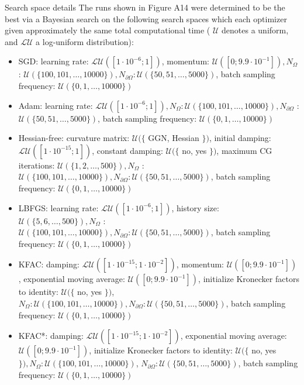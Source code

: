 \documentclass[10pt]{article}
\begin{document}
Search space details The runs shown in Figure A14 were determined to be the best via a Bayesian search on the following search spaces which each optimizer given approximately the same total computational time ( $\mathcal{U}$ denotes a uniform, and $\mathcal{L U}$ a log-uniform distribution):

\begin{itemize}
  \item SGD: learning rate: $\mathcal{L U}\left(\left[1 \cdot 10^{-6} ; 1\right]\right)$, momentum: $\mathcal{U}\left(\left[0 ; 9.9 \cdot 10^{-1}\right]\right), N_{\Omega}$ : $\mathcal{U}(\{100,101, \ldots, 10000\}), N_{\partial \Omega}: \mathcal{U}(\{50,51, \ldots, 5000\})$, batch sampling frequency: $\mathcal{U}(\{0,1, \ldots, 10000\})$
  \item Adam: learning rate: $\mathcal{L U}\left(\left[1 \cdot 10^{-6} ; 1\right]\right), N_{\Omega}: \mathcal{U}(\{100,101, \ldots, 10000\}), N_{\partial \Omega}$ : $\mathcal{U}(\{50,51, \ldots, 5000\})$, batch sampling frequency: $\mathcal{U}(\{0,1, \ldots, 10000\})$
  \item Hessian-free: curvature matrix: $\mathcal{U}(\{$ GGN, Hessian $\})$, initial damping: $\mathcal{L U}\left(\left[1 \cdot 10^{-15} ; 1\right]\right)$, constant damping: $\mathcal{U}(\{$ no, yes $\})$, maximum CG iterations: $\mathcal{U}(\{1,2, \ldots, 500\}), N_{\Omega}$ : $\mathcal{U}(\{100,101, \ldots, 10000\}), N_{\partial \Omega}: \mathcal{U}(\{50,51, \ldots, 5000\})$, batch sampling frequency: $\mathcal{U}(\{0,1, \ldots, 10000\})$
  \item LBFGS: learning rate: $\mathcal{L U}\left(\left[1 \cdot 10^{-6} ; 1\right]\right)$, history size: $\mathcal{U}(\{5,6, \ldots, 500\}), N_{\Omega}$ : $\mathcal{U}(\{100,101, \ldots, 10000\}), N_{\partial \Omega}: \mathcal{U}(\{50,51, \ldots, 5000\})$, batch sampling frequency: $\mathcal{U}(\{0,1, \ldots, 10000\})$
  \item KFAC: damping: $\mathcal{L U}\left(\left[1 \cdot 10^{-15} ; 1 \cdot 10^{-2}\right]\right)$, momentum: $\mathcal{U}\left(\left[0 ; 9.9 \cdot 10^{-1}\right]\right)$, exponential moving average: $\mathcal{U}\left(\left[0 ; 9.9 \cdot 10^{-1}\right]\right)$, initialize Kronecker factors to identity: $\mathcal{U}(\{$ no, yes $\})$, $N_{\Omega}: \mathcal{U}(\{100,101, \ldots, 10000\}), N_{\partial \Omega}: \mathcal{U}(\{50,51, \ldots, 5000\})$, batch sampling frequency: $\mathcal{U}(\{0,1, \ldots, 10000\})$
  \item KFAC*: damping: $\mathcal{L U}\left(\left[1 \cdot 10^{-15} ; 1 \cdot 10^{-2}\right]\right)$, exponential moving average: $\mathcal{U}\left(\left[0 ; 9.9 \cdot 10^{-1}\right]\right)$, initialize Kronecker factors to identity: $\mathcal{U}(\{$ no, yes $\}), N_{\Omega}: \mathcal{U}(\{100,101, \ldots, 10000\})$, $N_{\partial \Omega}: \mathcal{U}(\{50,51, \ldots, 5000\})$, batch sampling frequency: $\mathcal{U}(\{0,1, \ldots, 10000\})$
\end{itemize}
\end{document}
